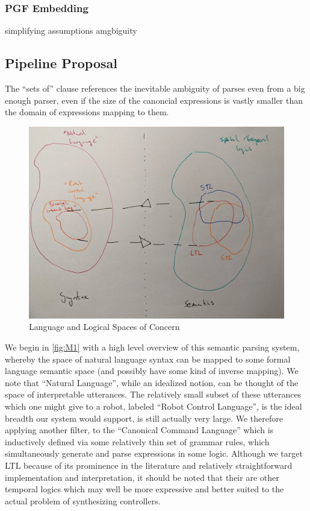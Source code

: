 \documentclass[a4paper, 11pt]{article}
\begin{document}
\subsubsection{PGF Embedding}

simplifying assumptions
amgbiguity

\subsection{Pipeline Proposal}

The ``sets of'' clause
references the inevitable ambiguity of parses even from a big enough parser, even
if the size of the canoncial expressions is vastly smaller than the domain of
expressions mapping to them.

\begin{figure}[H]
\centering
\includegraphics[width=150mm]{pics/one.jpg}
\caption{Language and Logical Spaces of Concern} \label{fig:M1}
\end{figure}

We begin in \autoref{fig:M1} with a high level overview of this semantic parsing
system, whereby the space of natural language syntax can be mapped to some
formal language semantic space (and possibly have some kind of inverse mapping).
We note that ``Natural Language'', while an idealized notion, can be thought of
the space of interpretable utterances. The relatively small subset of these
utterances which one might give to a robot, labeled ``Robot Control Language'',
is the ideal breadth our system would support, is still actually very large. We
therefore applying another filter, to the ``Canonical Command Language'' which
is inductively defined via some relatively thin set of grammar rules, which
simultaneously generate and parse expressions in some logic. Although we target
LTL because of its prominence in the literature and relatively straightforward
implementation and interpretation, it should be noted that their are other
temporal logics which may well be more expressive and better suited to the
actual problem of synthesizing controllers.
\end{document}
